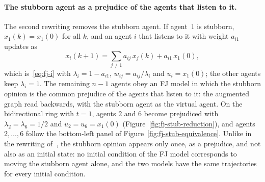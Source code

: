 \paragraph{The stubborn agent as a prejudice of the agents that listen to it.}
The second rewriting removes the stubborn agent. If agent~$1$ is stubborn,
$x_1(k) = x_1(0)$ for all $k$, and an agent $i$ that listens to it with weight
$a_{i1}$ updates as
\[
  x_i(k+1) = \sum_{j \neq 1} a_{ij}\, x_j(k) + a_{i1}\, x_1(0),
\]
which is~\eqref{eq:fj-i} with $\lambda_i = 1 - a_{i1}$, $w_{ij} = a_{ij}/\lambda_i$ and
$u_i = x_1(0)$; the other agents keep $\lambda_i = 1$. The remaining $n - 1$ agents obey
an FJ model in which the stubborn opinion is the common prejudice of the agents that
listen to it: the augmented graph read backwards, with the stubborn agent as the
virtual agent. On the bidirectional ring with $t = 1$, agents $2$ and $6$ become
prejudiced with $\lambda_2 = \lambda_6 = 1/2$ and $u_2 = u_6 = x_1(0)$
(Figure~\ref{fig:fj-stub-reduction}), and agents $2, \dots, 6$ follow the bottom-left panel of Figure~\ref{fig:fj-stub-equivalence}.
Unlike in the rewriting of~\cite{proskurnikov2017tutorial}, the stubborn opinion appears
only once, as a prejudice, and not also as an initial state: no initial condition of the
FJ model corresponds to moving the stubborn agent alone, and the two models have the
same trajectories for every initial condition.
